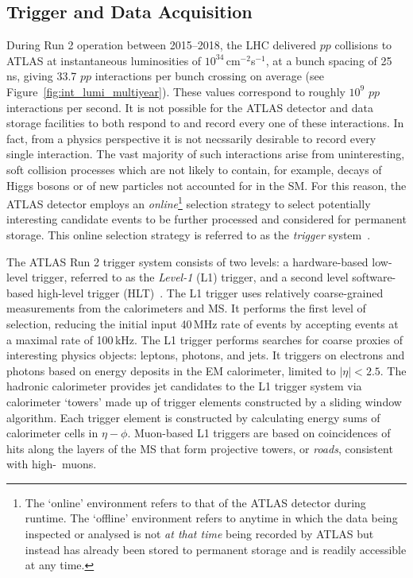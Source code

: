 \subsection{Trigger and Data Acquisition}
\label{sec:tdaq}

During Run 2 operation between 2015--2018, the LHC delivered $pp$ collisions to ATLAS at instantaneous luminosities of
$10^{34}$\,cm$^{-2}$s$^{-1}$, at a bunch spacing of 25\,ns, giving 33.7 $pp$ interactions per bunch crossing on average
(see Figure~\ref{fig:int_lumi_multiyear}).
These values correspond to roughly $10^9$ $pp$ interactions per second.
It is not possible for the ATLAS detector and data storage facilities to both respond to and record every one of these interactions.
In fact, from a physics perspective it is not necssarily desirable to record every single interaction.
The vast majority of such interactions arise from uninteresting, soft collision processes which are not likely
to contain, for example, decays of Higgs bosons or of new particles not accounted for in the SM.
For this reason, the ATLAS detector employs an \textit{online}\footnote{The `online' environment refers to that of the
ATLAS detector during runtime. The `offline' environment refers to anytime in which the data being inspected
or analysed is not \textit{at that time} being recorded by ATLAS but instead has already been stored to permanent storage
and is readily accessible at any time.}
selection strategy to select potentially interesting candidate events to be further processed and considered
for permanent storage. This online selection strategy is referred to as the \textit{trigger} system~\cite{Jenni:616089}.

The ATLAS Run 2 trigger system consists of two levels: a hardware-based low-level
trigger, referred to as the \textit{Level-1} (L1) trigger, and a second level software-based high-level trigger (HLT)~\cite{PanduroVazquez:2244345}.
The L1 trigger uses relatively coarse-grained measurements from the calorimeters and MS.
It performs the first level of selection, reducing the initial input 40\,MHz rate of events by
accepting events at a maximal rate of 100\,kHz.
The L1 trigger performs searches for coarse proxies of interesting physics objects: leptons, photons, and jets.
It triggers on electrons and photons based on energy deposits in the EM calorimeter, limited to $\lvert \eta \rvert < 2.5$.
The hadronic calorimeter provides jet candidates to the L1 trigger system via calorimeter `towers' made up of
trigger elements constructed by a sliding window algorithm.
Each trigger element is constructed by calculating energy sums of calorimeter cells in $\eta - \phi$.
Muon-based L1 triggers are based on coincidences of hits along the layers of the MS that form
projective towers, or \textit{roads}, consistent with high-\pT~muons.

